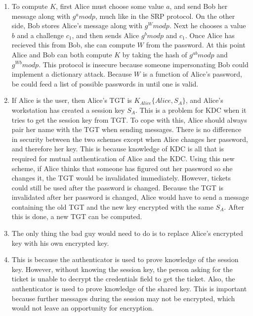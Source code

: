 \documentclass[11pt]{article}
\begin{document}
\begin{enumerate}
\item 

To compute $K$, first Alice must choose some value $a$, and send Bob her message along with $g^a mod p$, much like in the SRP protocol.  On the other side, Bob stores Alice's message along with $g^W mod p$.  Next he chooses a value $b$ and a challenge $c_1$, and then sends Alice $g^b mod p$ and $c_1$.  Once Alice has recieved this from Bob, she can compute $W$ from the password.  At this point Alice and Bob can both compute $K$ by taking the hash of $g^{ab} mod p$ and $g^{Wb} mod p$.  This protocol is insecure because someone impersonating Bob could implement a dictionary attack.  Because $W$ is a function of Alice's password, be could feed a list of possible passwords in until one is valid.  

\item 

If Alice is the user, then Alice's TGT is $K_{Alice}\{ Alice, S_A \}$, and Alice's workstation has created a session key $S_A$.  This is a problem for KDC when it tries to get the session key from TGT.  To cope with this, Alice should always pair her name with the TGT when sending messages.  There is no difference in security between the two schemes except when Alice changes her password, and therefore her key.  This is because knowledge of KDC is all that is required for mutual authentication of Alice and the KDC.  Using this new scheme, if Alice thinks that someone has figured out her password so she changes it, the TGT would be invalidated immediately.  However, tickets could still be used after the password is changed.  Because the TGT is invalidated after her password is changed, Alice would have to send a message containing the old TGT and the new key encrypted with the same $S_A$.  After this is done, a new TGT can be computed.  

\item 

The only thing the bad guy would need to do is to replace Alice's encrypted key with his own encrypted key.  

\item 

This is because the authenticator is used to prove knowledge of the session key.  However, without knowing the session key, the person asking for the ticket is unable to decrypt the credentials field to get the ticket.  Also, the authenticator is used to prove knowledge of the shared key.  This is important because further messages during the session may not be encrypted, which would not leave an opportunity for encryption.  


\end{enumerate}
\end{document}

